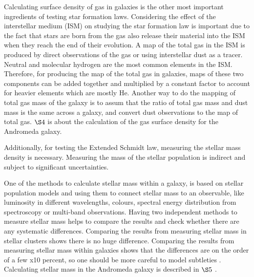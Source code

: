 \documentclass[useAMS,usenatbib]{mn2e}
\begin{document}
Calculating surface density of gas in galaxies is the other most important ingredients of testing star formation laws. Considering the effect of the interstellar medium (ISM) on studying the star formation law is important due to the fact that stars are born from the gas also release their material into the ISM when they reach the end of their evolution. A map of the total gas in the ISM is produced by direct observations of the gas or using interstellar dust as a tracer. Neutral and molecular hydrogen are the most common elements in the ISM. Therefore, for producing the map of the total gas in galaxies, maps of these two components can be added together and multiplied by a constant factor to account for heavier elements which are mostly He. Another way to do the mapping of total gas mass of the galaxy is to assum that the ratio of total gas mass and dust mass is the same across a galaxy, and convert dust observations to the map of total gas. $\S4$ is about the calculation of the gas surface density for the Andromeda galaxy.


Additionally, for testing the Extended Schmidt law, measuring the stellar mass density is necessary. Measuring the mass of the stellar population is indirect and subject to significant uncertainties.%

One of the methods to calculate stellar mass within a galaxy, is based on stellar population models \citep[e.g.][]{ Bruzual93, Kotulla09} and using them to connect stellar mass to an observable, like luminosity in different wavelengths, colours, spectral energy distribution from spectroscopy or multi-band observations. Having two independent methods to measure stellar mass helps to compare the results and check whether there are any systematic differences. Comparing the results from measuring stellar mass in stellar clusters shows there is no huge difference. Comparing the results from measuring stellar mass within galaxies shows that the differences are on the order of a few x10 percent, so one should be more careful to model subtleties \citep{McLaughlin05}. Calculating stellar mass in the Andromeda galaxy is described in  $\S5$ .
\end{document}
